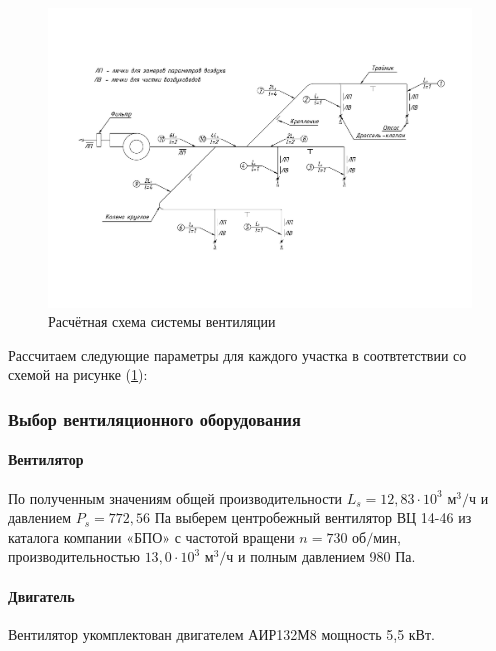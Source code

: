 \begin{figure}[ht]
    \centering
    \includegraphics[width=\textwidth, keepaspectratio, clip=true, trim=0mm 35mm 0mm 40mm]
                    {./src/ecology/pictures/vent_system_arrangement}
    \caption{Расчётная схема системы вентиляции}
    \label{pic_vent_system_arrangement}
\end{figure}

Рассчитаем следующие параметры для каждого участка в соотвтетствии со схемой на
рисунке (\ref{pic_vent_system_arrangement}):



\subsubsection{Выбор вентиляционного оборудования}

\paragraph{Вентилятор}
По полученным значениям общей производительности $L_s = 12,83 \cdot 10^3 \text{ м}^3 / \text{ч}$
и давлением $P_s = 772,56 \text{ Па}$ выберем центробежный
вентилятор ВЦ 14-46 из каталога компании «БПО» с частотой вращени
$n = 730 \text{ об/мин}$, производительностью $13,0 \cdot 10^3 \text{ м}^3 / \text{ч}$
и полным давлением 980 Па.

\paragraph{Двигатель}
Вентилятор укомплектован двигателем АИР132М8 мощность 5,5 кВт.

